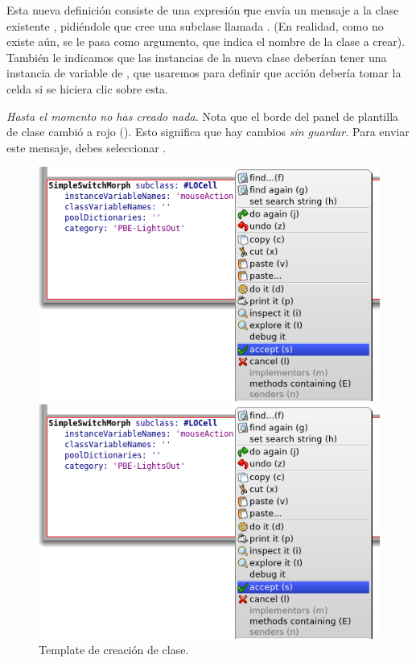 \documentclass[a4paper,10pt,twoside]{book}
\begin{document}
Esta nueva definici\'on consiste de una expresi\'on \st que env\'ia un mensaje a la
clase existente , pidi\'endole que cree una subclase llamada
. (En realidad, como  no existe a\'un, se le pasa 
  como argumento, que indica el nombre de la clase a 
crear). Tambi\'en le indicamos que las instancias de la nueva clase deber\'ian 
tener una instancia de variable de , que usaremos para definir
que acci\'on deber\'ia tomar la celda si se hiciera clic sobre esta.

\emph {Hasta el momento no has creado nada.}
Nota que el borde del panel de plantilla de clase cambi\'o a rojo ().
Esto significa que hay cambios \emph {sin guardar.}
Para enviar este mensaje, debes seleccionar . 

\begin{figure}[h!t]
\ifluluelse
  {\centerline {\includegraphics[width=\textwidth]{AcceptClassDef}}}
  {\centerline {\includegraphics[scale=0.7]{AcceptClassDef}}}
\caption{Template de creaci\'on de clase.
}
\end{figure}
\end{document}
